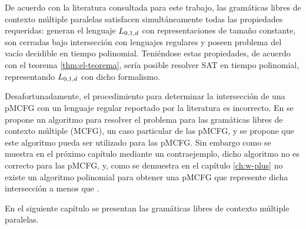 De acuerdo con la literatura consultada para este trabajo, las gramáticas libres de contexto múltiple paralelas satisfacen simultáneamente todas las propiedades requeridas: generan el lenguaje $L_{0,1,d}$ con representaciones de tamaño constante, son cerradas bajo intersección con lenguajes regulares y poseen problema del vacío decidible en tiempo polinomial. Teniéndose estas propiedades, de acuerdo con el teorema \ref{thm:el-teorema}, sería posible resolver SAT en tiempo polinomial, representando $L_{0,1,d}$ con dicho formalismo.

Desafortunadamente, el procedimiento para determinar la intersección de una pMCFG con un lenguaje regular reportado por la literatura es incorrecto. En \cite{Seki1991OnMC} se propone un algoritmo para resolver el problema para las gramáticas libres de contexto múltiple (MCFG), un caso particular de las pMCFG, y se propone que este algoritmo pueda ser utilizado para las pMCFG. Sin embargo como se muestra en el próximo capítulo mediante un contraejemplo, dicho algoritmo no es correcto para las pMCFG, y, como se demuestra en el capítulo \ref{ch:w-plus} no existe un algoritmo polinomial para obtener una pMCFG que represente dicha intersección a menos que \pnp.

En el siguiente capítulo se presentan las gramáticas libres de contexto múltiple paralelas.
